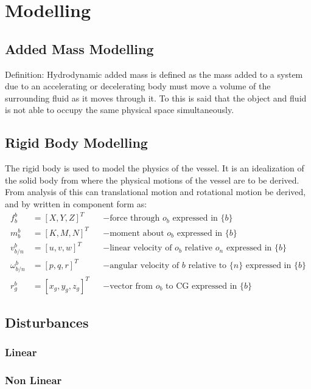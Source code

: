 \chapter{Modelling}

\section{Added Mass Modelling}
Definition: Hydrodynamic added mass is defined as the mass added to a system due to an accelerating or decelerating body must move a volume of the surrounding fluid as it moves through it. To this is said that the object and fluid is not able to occupy the same physical space simultaneously.

\section{Rigid Body Modelling}
The rigid body is used to model the physics of the vessel. It is an idealization of the solid body from where the physical motions of the vessel are to be derived. From analysis of this can translational motion and rotational motion be derived, and by \citep{fossen} written in component form as:
\begin{align}
f^b_b &= [X,Y,Z]^T & &- \text{force through } o_b \text{ expressed in } \{b\}\\
m^b_b &= [K,M,N]^T & &- \text{moment about } o_b \text{ expressed in } \{b\}\\
v^b_{b/n} &= [u,v,w]^T & &- \text{linear velocity of } o_b \text{ relative } o_n \text{ expressed in } \{b\}\\
\omega^b_{b/n} &= [p,q,r]^T & &- \text{angular velocity of } {b} \text{ relative to } \{n\} \text{ expressed in } \{b\}\\
r^b_g &= [x_g,y_g,z_g]^T & &- \text{vector from } o_b \text{ to CG expressed in } \{b\}
\end{align}

\section{Disturbances}


\subsection{Linear}


\subsection{Non Linear}


